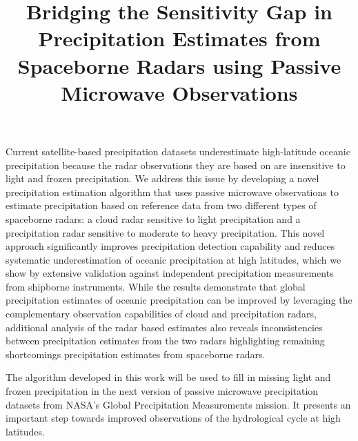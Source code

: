 \documentclass{ametsocV6.1}
\title{Bridging the Sensitivity Gap in Precipitation Estimates from Spaceborne Radars using Passive Microwave Observations}
\affiliation{\aff{a}{Department of Atmospheric Science, Colorado State University, Fort Collins, USA}}
\begin{document}
\maketitle

%
%
%
\statement

    Current satellite-based precipitation datasets underestimate high-latitude
    oceanic precipitation because the radar observations they are based on are
    insensitive to light and frozen precipitation. We address this issue by
    developing a novel precipitation estimation algorithm that uses passive
    microwave observations to estimate precipitation based on reference data
    from two different types of spaceborne radars: a cloud radar sensitive to
    light precipitation and a precipitation radar sensitive to moderate to heavy
    precipitation. This novel approach significantly improves precipitation
    detection capability and reduces systematic underestimation of oceanic
    precipitation at high latitudes, which we show by extensive validation
    against independent precipitation measurements from shipborne instruments.
    While the results demonstrate that global precipitation estimates of oceanic
    precipitation can be improved by leveraging the complementary observation
    capabilities of cloud and precipitation radars, additional analysis of the
    radar based estimates also reveals inconsistencies between precipitation
    estimates from the two radars highlighting remaining shortcomings
    precipitation estimates from spaceborne radars.

    The algorithm developed in this work will be used to fill in missing light and
    frozen precipitation in the next version of passive microwave precipitation
    datasets from NASA's Global Precipitation Measurements mission. It presents
    an important step towards improved observations of the hydrological cycle at
    high latitudes.


%
\end{document}
